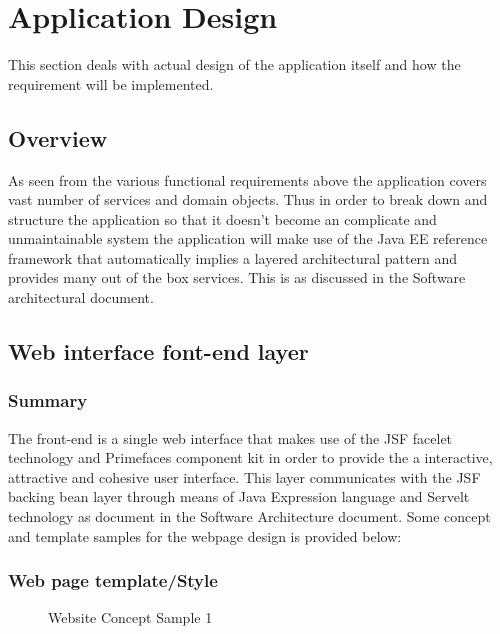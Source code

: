 \documentclass[12pt]{article}
\begin{document}
\section{Application Design}
This section deals with actual design of the application itself and how the requirement will be implemented.
\subsection{Overview}
As seen from the various functional requirements above the application covers vast number of services and domain objects. Thus in order to break down and structure the application so that it doesn't become an complicate and unmaintainable system the application will make use of the Java EE reference framework that automatically implies a layered architectural pattern and provides many out of the box services. This is as discussed in the Software architectural document.

\newpage
\subsection{Web interface font-end layer}
\subsubsection{Summary}
The front-end is a single web interface that makes use of the JSF facelet technology and Primefaces component kit in order to provide the a interactive, attractive and cohesive user interface. This layer communicates with the JSF backing bean layer through means of Java Expression language and Servelt technology as document in the Software Architecture document. Some concept and template samples for the webpage design is provided below:
\newpage
\subsubsection{Web page template/Style}
\begin{figure}[H]
\centering	
{}
\caption{Website Concept Sample 1}
\end{figure}
\end{document}
